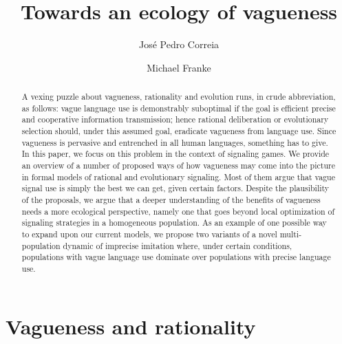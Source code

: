 \documentclass[a4paper]{article}
\begin{document}
\title{Towards an ecology of vagueness}
\author{Jos\'e Pedro Correia \and Michael Franke}
\date{}

\maketitle

\begin{abstract}
A vexing puzzle about vagueness, rationality and evolution runs, in crude abbreviation, as follows: vague language use is demonstrably suboptimal if the goal is efficient precise and cooperative information transmission; hence rational deliberation or evolutionary selection should, under this assumed goal, eradicate vagueness from language use.
Since vagueness is pervasive and entrenched in all human languages, something has to give.
In this paper, we focus on this problem in the context of signaling games.
We provide an overview of a number of proposed ways of how vagueness may come into the picture in formal models of rational and evolutionary signaling.
Most of them argue that vague signal use is simply the best we can get, given certain factors.
Despite the plausibility of the proposals, we argue that a deeper understanding of the benefits of vagueness needs a more ecological perspective, namely one that goes beyond local optimization of signaling strategies in a homogeneous population.
As an example of one possible way to expand upon our current models, we propose two variants of
a novel multi-population dynamic of imprecise imitation where, under certain conditions,
populations with vague language use dominate over populations with precise language use.
\end{abstract}



\section{Vagueness and rationality}
\label{sec:vagueness}
\end{document}
